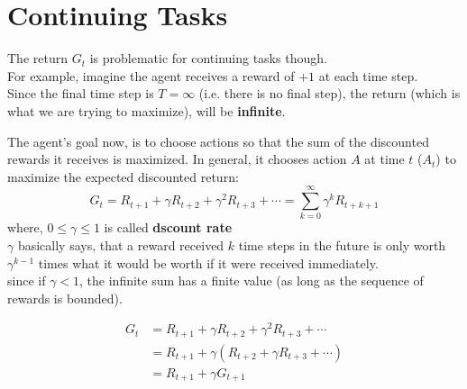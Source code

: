 \section{Continuing Tasks \cite{medium-introduction-to-reinforcement-learning-rl-part-3-finite-markov-decision-processes-51e1f8d3ddb7}}

The return $G_t$ is problematic for continuing tasks though.\\
For example, imagine the agent receives a reward of $+1$ at each time step.\\
Since the final time step is $T = \infty$ (i.e. there is no final step), the return (which is what we are trying to maximize), will be \textbf{infinite}.

The agent’s goal now, is to choose actions so that the sum of the discounted rewards it receives is maximized.
In general, it chooses action $A$ at time $t$ ($A_t$) to maximize the expected discounted return:
\[
    G_t = R_{t+1} + \gamma R_{t+2} + \gamma^2 R_{t+3} + \cdots = \sum_{k=0}^{\infty} \gamma^k R_{t+k+1}
\]
where, $0 \leq \gamma \leq 1$ is called \textbf{dscount rate}\\
$\gamma$ basically says, that a reward received $k$ time steps in the future is only worth $\gamma^{k-1}$ times what it would be worth if it were received immediately.\\
since if $\gamma < 1$, the infinite sum has a finite value (as long as the sequence of rewards is bounded).

\begin{align*}
    G_t &= R_{t+1} + \gamma R_{t+2} + \gamma^2 R_{t+3} + \cdots \\
    &= R_{t+1} + \gamma (R_{t+2} + \gamma R_{t+3} + \cdots)\\
    &= R_{t+1} + \gamma G_{t+1}
\end{align*}

